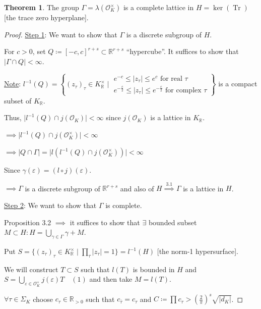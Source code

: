 \documentclass[openany]{amsbook}
\numberwithin{section}{chapter}
\theoremstyle{definition}
\newtheorem{theorem}{Theorem}[chapter]
\newcommand{\Tr}{\operatorname{Tr}}
\begin{document}
\begin{theorem}
    The group \(\Gamma = \lambda(\mathcal{O}_K^\times)\) is a complete lattice in \(H = \ker(\Tr)\) [the trace zero hyperplane].
\end{theorem}

\begin{proof}
    \underline{Step 1}: We want to show that \(\Gamma\) is a discrete subgroup of \(H\).

    For \(c > 0\), set \(Q \coloneqq [-c,c]^{r+s} \subset \mathbb{R}^{r+s}\) ``hypercube''. It suffices to show that \(\vert \Gamma \cap Q \vert < \infty \).

    \underline{Note}: \(l ^{-1} (Q) = \left\{ (z_{\tau})_{\tau} \in K_\mathbb{R}^\times \mid \substack{e^{-c} \leq \vert z_{\tau} \vert \leq e^c \text{ for real } \tau \\ e^{-\frac{c}{2}} \leq \vert z_{\tau} \vert \leq e^{-\frac{c}{2}} \text{ for complex } \tau } \right\} \) is a compact subset of \(K_\mathbb{R}\).

    Thus, \(\vert l ^{-1} (Q) \cap j(\mathcal{O}_K) \vert < \infty \) since \(j(\mathcal{O}_K)\) is a lattice in \(K_\mathbb{R}\).

    \(\implies \vert l^{-1} (Q) \cap j(\mathcal{O}_K^\times) \vert < \infty\) 

    \(\implies \vert Q\cap \Gamma \vert = \vert l(l ^{-1} (Q)\cap j(\mathcal{O}_K^\times)) \vert < \infty\) 

    Since \(\gamma (\varepsilon) = (l \circ j)(\varepsilon)\).

    \(\implies \Gamma\) is a discrete subgroup of \(\mathbb{R} ^{r+s}\) and also of \(H\overset{3.1}{\implies} \Gamma\) is a lattice in \(H\).

    \underline{Step 2}: We want to show that \(\Gamma\) is complete.

    Proposition 3.2 \(\implies\) it suffices to show that \(\exists\) bounded subset \(M \subset H : H= \bigcup_{\gamma \in \Gamma}^{} \gamma + M\).

    Put \(S = \{ (z_{\tau})_{\tau} \in K_\mathbb{R}^\times \mid \prod _\tau \vert z_{\tau}  \vert =1 \} = l ^{-1} (H) \) [the norm-1 hypersurface]. 

    We will construct \(T \subset S\) such that \(l(T)\) is bounded in \(H\) and \(\boxed{S = \bigcup_{\varepsilon \in \mathcal{O}_K^\times}^{} j(\varepsilon)T \quad (1)}\) and then take \(M = l(T)\).

    \(\forall \tau \in \Sigma_K\) choose \(c_{\tau} \in \mathbb{R}_{>0}\) such that \(c_{\overline{\tau }} = c_{\tau}\) and  \(C \coloneqq \prod c_{\tau} > \left( \frac{2}{\pi} \right) ^s \sqrt{\vert d_K \vert } \).


\end{proof}
\end{document}
